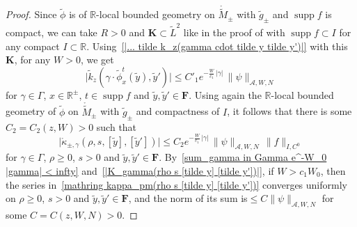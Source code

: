 \documentclass{memo-l}
\theoremstyle{plain}
\theoremstyle{definition}
\theoremstyle{remark}
\newcommand{\R}{\mathbb{R}}
\renewcommand{\AA}{\mathcal{A}}
\newcommand{\bfF}{\boldsymbol{F}}
\newcommand{\bfK}{\boldsymbol{K}}
\newcommand{\supp}{\operatorname{supp}}
\numberwithin{section}{chapter}
\numberwithin{equation}{section}%
\begin{document}
\begin{proof}
Since $\tilde\phi$ is of $\R$-local bounded geometry on $\mathring{\widetilde M}_\pm$ with $\tilde g_\pm$ and $\supp f$ is compact, we can take $R>0$ and $\bfK\subset{\widetilde L}^2$ like in the proof of  with $\supp f\subset I$ for any compact $I\subset\R$. Using~\eqref{|... tilde k_z(gamma cdot tilde y tilde y')|} with this $\bfK$, for any $W>0$, we get
\[
\big|\tilde k_z(\gamma\cdot\tilde\phi^t_x(\tilde y),\tilde y')\big| \le C'_1 e^{-\frac{W}{c_1}\,|\gamma|}\,\|\psi\|_{\AA, W,N}
\]
for $\gamma\in\Gamma$, $x\in\R^\pm$, $t \in \supp f$ and $\tilde y,\tilde y' \in \bfF$. Using again the $\R$-local bounded geometry of $\tilde\phi$ on $\mathring{\widetilde M}_\pm$ with $\tilde g_\pm$ and compactness of $I$, it follows that there is some $C_2=C_2(z,W)>0$ such that
\begin{equation}\label{|K_gamma(rho s [tilde y] [tilde y'])|}
\big|\mathring\kappa_{\pm,\gamma}(\rho,s,[\tilde y],[\tilde y'])\big|
\le C_2 e^{-\frac{W}{c_1}\,|\gamma|}\,\|\psi\|_{\AA,W,N}\,\|f\|_{I,C^0}
\end{equation}
for $\gamma\in\Gamma$, $\rho\ge0$, $s>0$ and $\tilde y,\tilde y'\in \bfF$. By~\eqref{sum_gamma in Gamma e^-W_0 |gamma| < infty} and~\eqref{|K_gamma(rho s [tilde y] [tilde y'])|}, if $W>c_1W_0$, then the series in~\eqref{mathring kappa_pm(rho s [tilde y] [tilde y'])} converges uniformly on $\rho\ge0$, $s>0$ and $\tilde y,\tilde y'\in \bfF$, and the norm of its sum is${}\le C \|\psi\|_{\AA, W,N}$ for some $C=C(z,W,N)>0$. 


\end{proof}
\end{document}
